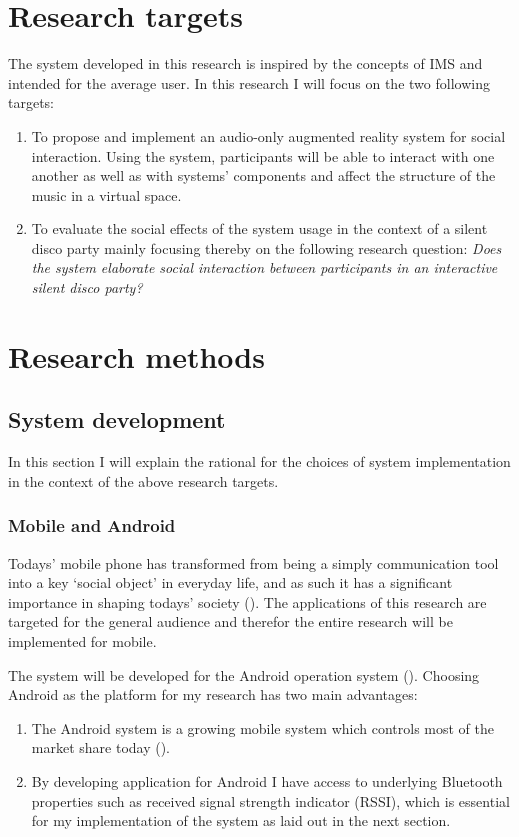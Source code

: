 \documentclass[a4paper,11pt]{article}
\begin{document}
\section{Research targets}

The system developed in this research is inspired by the concepts of IMS and intended for the average user. In this research I will focus on the two following targets:
\begin{enumerate}
	\item To propose and implement an audio-only augmented reality system for social interaction.
	Using the system, participants will be able to interact with one another as well as with systems' components and affect the structure of the music in a virtual space.
	\item To evaluate the social effects of the system usage in the context of a silent disco party mainly focusing thereby on the following research question: \emph{Does the system elaborate social interaction between participants in an interactive silent disco party?}
\end{enumerate}

\section{Research methods}

\subsection{System development}

In this section I will explain the rational for the choices of system implementation in the context of the above research targets.

\subsubsection{Mobile and Android}

Todays' mobile phone has transformed from being a simply communication tool into a key `social object' in everyday life, and as such it has a significant importance in shaping todays' society (\cite{srivastava05}).
The applications of this research are targeted for the general audience and therefor the entire research will be implemented for mobile.

The system will be developed for the Android operation system (\citeauthor{web:android}).
Choosing Android as the platform for my research has two main advantages:
\begin{enumerate}
	\item The Android system is a growing mobile system which controls most of the market share today (\cite{web:idc}).
	\item By developing application for Android I have access to underlying Bluetooth properties such as received signal strength indicator (RSSI), which is essential for my implementation of the system as laid out in the next section.
\end{enumerate}
\end{document}
